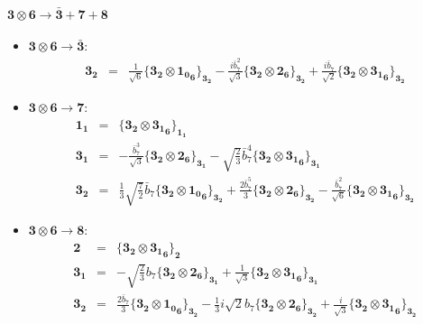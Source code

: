 \documentclass[english]{article}
\newcommand{\subcg}[3]{\big\{ {#1}\otimes{#2}\big\}^{}_{#3}}
\newcommand{\rep}[1]{\mathbf{#1}}
\begin{document}
\paragraph*{\Large $\rep{3}\otimes\rep{6}\to\rep{\bar{3}}+\rep{7}+\rep{8}$}
\begin{itemize}
\item $\rep{3}\otimes\rep{6}\to\rep{\bar{3}}$:
\begin{eqnarray*}
\rep{3_2} &=& \frac{1}{\sqrt{6}}\subcg{\rep{3_2}}{{\rep{{1_{0}}_{6}}}}{\rep{3_2}}-\frac{i \bar{b}_7^2}{\sqrt{3}}\subcg{\rep{3_2}}{\rep{2}_{\rep{6}}}{\rep{3_2}}+\frac{i \bar{b}_7}{\sqrt{2}}\subcg{\rep{3_2}}{\rep{3_1}_{\rep{6}}}{\rep{3_2}}
\end{eqnarray*}
\item $\rep{3}\otimes\rep{6}\to\rep{7}$:
\begin{eqnarray*}
\rep{1_1} &=& \subcg{\rep{3_2}}{\rep{3_1}_{\rep{6}}}{\rep{1_1}}
\\
\rep{3_1} &=& -\frac{\bar{b}_7^3}{\sqrt{3}}\subcg{\rep{3_2}}{\rep{2}_{\rep{6}}}{\rep{3_1}}-\sqrt{\frac{2}{3}} \bar{b}_7^4\subcg{\rep{3_2}}{\rep{3_1}_{\rep{6}}}{\rep{3_1}}
\\
\rep{3_2} &=& \frac{1}{3} \sqrt{\frac{7}{2}} \bar{b}_7\subcg{\rep{3_2}}{\rep{1_0}_{\rep{6}}}{\rep{3_2}}+\frac{2 \bar{b}_7^5}{3}\subcg{\rep{3_2}}{\rep{2}_{\rep{6}}}{\rep{3_2}}-\frac{\bar{b}_7^2}{\sqrt{6}}\subcg{\rep{3_2}}{\rep{3_1}_{\rep{6}}}{\rep{3_2}}
\end{eqnarray*}
\item $\rep{3}\otimes\rep{6}\to\rep{8}$:
\begin{eqnarray*}
\rep{2} &=& \subcg{\rep{3_2}}{\rep{3_1}_{\rep{6}}}{\rep{2}}
\\
\rep{3_1} &=& -\sqrt{\frac{2}{3}} b_7\subcg{\rep{3_2}}{\rep{2}_{\rep{6}}}{\rep{3_1}}+\frac{1}{\sqrt{3}}\subcg{\rep{3_2}}{\rep{3_1}_{\rep{6}}}{\rep{3_1}}
\\
\rep{3_2} &=& \frac{2 \bar{b}_7}{3}\subcg{\rep{3_2}}{\rep{1_0}_{\rep{6}}}{\rep{3_2}}-\frac{1}{3} i \sqrt{2} b_7\subcg{\rep{3_2}}{\rep{2}_{\rep{6}}}{\rep{3_2}}+\frac{i}{\sqrt{3}}\subcg{\rep{3_2}}{\rep{3_1}_{\rep{6}}}{\rep{3_2}}
\end{eqnarray*}
\end{itemize}
\end{document}
